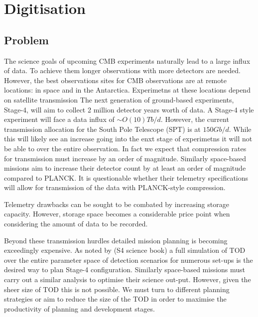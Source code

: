\documentclass[apj]{emulateapj}
\begin{document}



\section{Digitisation}
\label{sec:dig}

\subsection{Problem}
\label{subsec:problem}


The science goals of upcoming CMB experiments naturally lead to a large influx of data. To achieve them longer observations with more detectors are needed. However, the best observations sites for CMB observations are at remote locations: in space and in the Antarctica. Experimetns at these locations depend on satellite transmission The next generation of ground-based experiments, Stage-4, will aim to collect 2 million detector years worth of data. A Stage-4 style experiment will face a data influx of $\sim O(10)Tb/d$. However, the current transmission allocation for the South Pole Telescope (SPT) is at $150Gb/d$. While this will likely see an increase going into the enxt stage of experimetns it will not be able to over the entire observation. In fact we expect that compression rates for transmission must increase by an order of magnitude. Similarly space-based missions aim to increase their detector count by at least an order of magnitude compared to PLANCK. It is questionable whether their telemetry specifications will allow for transmission of the data with PLANCK-style compression. 


Telemetry drawbacks can be sought to be combated by increasing storage capacity. However, storage space becomes a considerable price point when considering the amount of data to be recorded.



Beyond these transmission hurdles detailed mission planning is becoming exceedingly expensive. As noted by (S4 science book) a full simulation of TOD over the entire parameter space of detection scenarios for numerous set-ups is the desired way to plan Stage-4 configuration. Similarly space-based missions must carry out a similar analysis to optimise their science out-put. However, given the sheer size of TOD this is not possible. We must turn to different planning strategies or aim to reduce the size of the TOD in order to maximise the productivity of planning and development stages.
\end{document}
